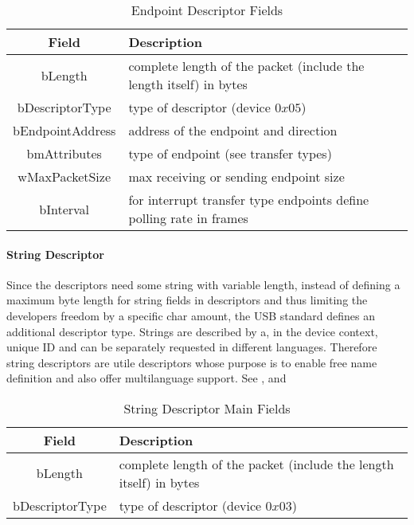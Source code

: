 \begin{table}[h!]
\begin{tabular}{c|p{9cm}}
Field & Description \\ \hline
bLength & complete length of the packet (include the length itself) in bytes \\
bDescriptorType & type of descriptor (device $0x05$) \\
bEndpointAddress & address of the endpoint and direction\\
bmAttributes & type of endpoint (see transfer types)\\
wMaxPacketSize & max receiving or sending endpoint size\\
bInterval & for interrupt transfer type endpoints define polling rate in frames\\
\end{tabular}
 \caption[Table]{Endpoint Descriptor Fields}
 \label{tab:endpointdescriptor}
\end{table}

\paragraph{String  Descriptor}
Since the descriptors need some string with variable length, instead of defining a maximum byte length for string fields in descriptors and thus 
limiting the developers freedom by a specific char amount, the USB standard defines an additional descriptor type. Strings are 
described by a, in the device context, unique ID and can be separately requested in different languages. Therefore string descriptors 
are utile descriptors whose purpose is to enable free name definition and also offer multilanguage support. See , 
 and %

\begin{table}[h!]
\begin{tabular}{c|p{9cm}}
Field & Description \\ \hline
bLength & complete length of the packet (include the length itself) in bytes \\
bDescriptorType & type of descriptor (device $0x03$)
\end{tabular}
 \caption[Table]{String Descriptor Main Fields}
 \label{tab:stringdescriptorMain}
\end{table}


